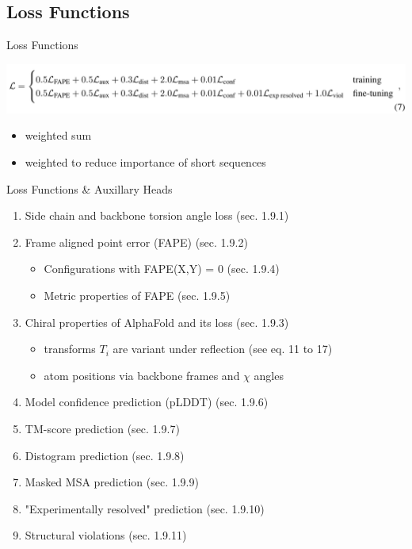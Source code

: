 \documentclass[presentation, smaller]{beamer}
\begin{document}
\subsection*{Loss Functions}
\label{sec:org57280e1}
\begin{frame}[label={sec:org21caa67}]{Loss Functions  \cite{jumperHighlyAccurateProtein2021}}
\begin{center}
\includegraphics[width=.9\linewidth]{./imgs/loss-eq.png}
\end{center}

\begin{itemize}
\item weighted sum
\item weighted to reduce importance of short sequences
\end{itemize}
\end{frame}

\begin{frame}[label={sec:orge3823ec}]{Loss Functions \& Auxillary Heads \cite{jumperHighlyAccurateProtein2021}}
\begin{enumerate}
\item Side chain and backbone torsion angle loss (sec. 1.9.1)
\item Frame aligned point error (FAPE) (sec. 1.9.2)
\begin{itemize}
\item Configurations with FAPE(X,Y) = 0 (sec. 1.9.4)
\item Metric properties of FAPE (sec. 1.9.5)
\end{itemize}
\item Chiral properties of AlphaFold and its loss (sec. 1.9.3)
\begin{itemize}
\item transforms \(T_i\) are variant under reflection (see eq. 11 to 17)
\item atom positions via backbone frames and \(\chi\) angles
\end{itemize}
\item Model confidence prediction (pLDDT) (sec. 1.9.6)
\item TM-score prediction (sec. 1.9.7)
\item Distogram prediction (sec. 1.9.8)
\item Masked MSA prediction (sec. 1.9.9)
\item "Experimentally resolved" prediction (sec. 1.9.10)
\item Structural violations (sec. 1.9.11)
\end{enumerate}
\end{frame}
\end{document}
